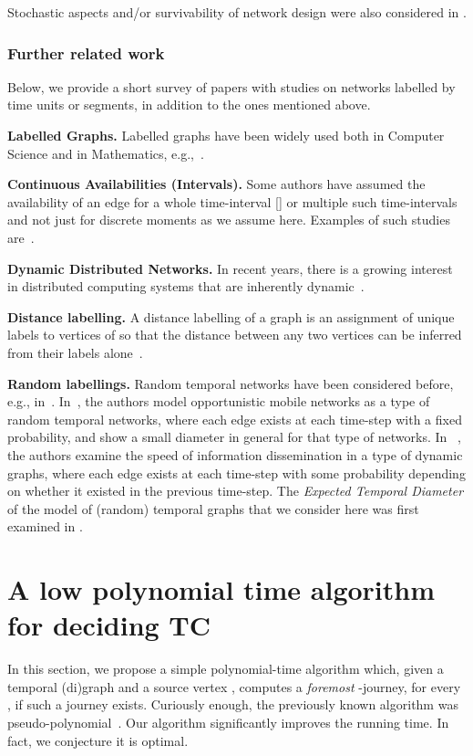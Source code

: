 \documentclass[a4paper,UKenglish]{article}
\begin{document}
Stochastic aspects and/or survivability of network design were also considered in \cite{gupta,lap1, lap2}.


\subsubsection{Further related work}
Below, we provide a short survey of papers with studies on networks labelled by time units or segments, in addition to the ones mentioned above.
	
\noindent \textbf{Labelled Graphs.} Labelled graphs have been widely used both in Computer Science and in Mathematics, e.g.,~\cite{molloy}. 

\noindent \textbf{Continuous Availabilities (Intervals).} Some authors have assumed the availability of an edge for a whole time-interval [] or multiple such time-intervals and not just for discrete moments as we assume here. Examples of such studies are~\cite{xuan, tardos, akrida-algo}.


\noindent \textbf{Dynamic Distributed Networks.} In recent years, there is a growing interest in distributed computing systems that are inherently dynamic~\cite{angluin, avin, casteigts, clementi, dutta, kuhn, spirakisb, spirakisc, o'dell, sch}.

\noindent \textbf{Distance labelling.} A distance labelling of a graph  is an assignment of unique labels to vertices of  so that the distance between any two vertices can be inferred from their labels alone~\cite{gavoille, katz}.

\noindent \textbf{Random labellings.} Random temporal networks have been considered before, e.g., in~\cite{chaintreau,clementi,akrida}. In~\cite{chaintreau}, the authors model opportunistic mobile networks as a type of random temporal networks, where each edge exists at each time-step with a fixed probability, and show a small diameter in general for that type of networks. In ~\cite{clementi}, the authors examine the speed of information dissemination in a type of dynamic graphs, where each edge exists at each time-step with some probability depending on whether it existed in the previous time-step. The \emph{Expected Temporal Diameter} of the model of (random) temporal graphs that we consider here was first examined in \cite{akrida}. 





\section{A low polynomial time algorithm for deciding TC
}\label{sec:foremost}
In this section, we propose a simple polynomial-time algorithm which, given a temporal (di)graph  and a source vertex , computes a \emph{foremost} -journey, for every , if such a journey exists. Curiously enough, the previously known algorithm was pseudo-polynomial~\cite{spirakis}. Our algorithm significantly improves the running time. In fact, we conjecture it is optimal.
\end{document}
